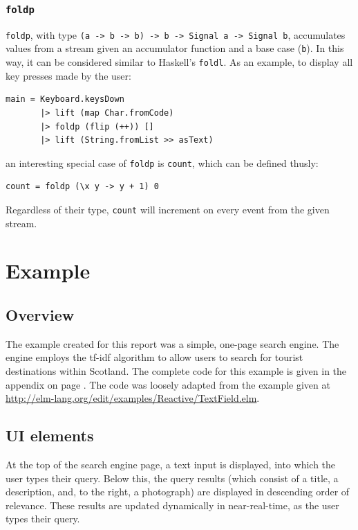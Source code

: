 \documentclass[12pt]{article}
\begin{document}
\subsubsection{\texttt{foldp}}
\texttt{foldp}, with type \texttt{(a -> b -> b) -> b -> Signal a -> Signal b}, accumulates values from a stream given an accumulator function and a base case (\texttt{b}). In this way, it can be considered similar to Haskell's \texttt{foldl}. As an example, to display all key presses made by the user:
\begin{samepage}
\begin{verbatim}
main = Keyboard.keysDown
       |> lift (map Char.fromCode)
       |> foldp (flip (++)) []
       |> lift (String.fromList >> asText)
\end{verbatim}
\end{samepage}
an interesting special case of \texttt{foldp} is \texttt{count}, which can be defined thusly:
\begin{verbatim}
count = foldp (\x y -> y + 1) 0
\end{verbatim}
Regardless of their type, \texttt{count} will increment on every event from the given stream.

\section{Example}

\subsection{Overview}
The example created for this report was a simple, one-page search engine. The engine 
employs the tf-idf algorithm to allow users to search for tourist destinations within
Scotland. The complete code for this example is given in the appendix on page \pageref{app:A}. The code was loosely adapted from the example given at 
\url{http://elm-lang.org/edit/examples/Reactive/TextField.elm}.

\subsection{UI elements}
At the top of the search engine page, a text input is displayed, into which the user
types their query. Below this, the query results (which consist of a title, a 
description, and, to the right, a photograph) are displayed in descending order of
relevance. These results are updated dynamically in near-real-time, as the user types 
their query.
\end{document}
